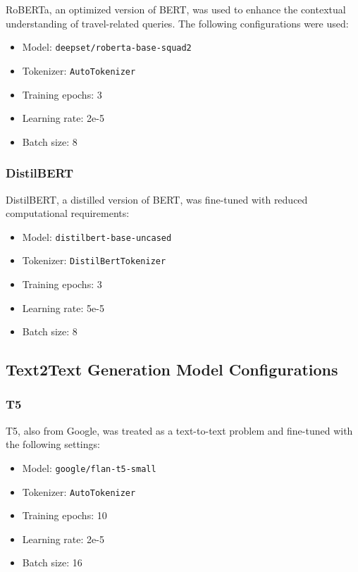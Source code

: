 \documentclass[conference]{IEEEtran}
\begin{document}
            RoBERTa, an optimized version of BERT, was used to enhance the contextual understanding of travel-related queries. The following configurations were used:
            \begin{itemize}
                \item Model: \texttt{deepset/roberta-base-squad2}
                \item Tokenizer: \texttt{AutoTokenizer}
                \item Training epochs: 3
                \item Learning rate: 2e-5
                \item Batch size: 8
            \end{itemize}

        \subsubsection{DistilBERT}

            DistilBERT, a distilled version of BERT, was fine-tuned with reduced computational requirements:
            \begin{itemize}
                \item Model: \texttt{distilbert-base-uncased}
                \item Tokenizer: \texttt{DistilBertTokenizer}
                \item Training epochs: 3
                \item Learning rate: 5e-5
                \item Batch size: 8
            \end{itemize}

    \subsection{Text2Text Generation Model Configurations}

        \subsubsection{T5}

            T5, also from Google, was treated as a text-to-text problem and fine-tuned with the following settings:
            \begin{itemize}
                \item Model: \texttt{google/flan-t5-small}
                \item Tokenizer: \texttt{AutoTokenizer}
                \item Training epochs: 10
                \item Learning rate: 2e-5
                \item Batch size: 16
            \end{itemize}
\end{document}
